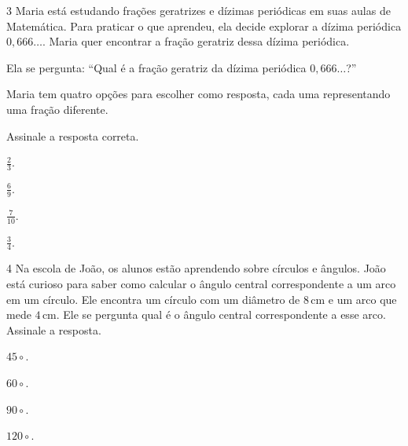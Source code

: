 \num{3} Maria está estudando frações geratrizes e dízimas periódicas em suas
aulas de Matemática. Para praticar o que aprendeu, ela decide explorar a
dízima periódica $0,666\ldots$. Maria quer encontrar a fração geratriz dessa
dízima periódica.

Ela se pergunta: “Qual é a fração geratriz da dízima periódica $0,666\ldots$?”

Maria tem quatro opções para escolher como resposta, cada uma representando uma fração diferente.

Assinale a resposta correta.

\begin{multicols}{2}
\begin{escolha}
\item $\frac{2}{3}$.
\item $\frac{6}{9}$.
\item $\frac{7}{10}$.
\item $\frac{3}{4}$.
\end{escolha}
\end{multicols}



\num{4} Na escola de João, os alunos estão aprendendo sobre círculos e
ângulos. João está curioso para saber como calcular o ângulo central
correspondente a um arco em um círculo. Ele encontra um círculo com um
diâmetro de $8\,\text{cm}$ e um arco que mede $4\,\text{cm}$. Ele se
pergunta qual é o ângulo central correspondente a esse arco. Assinale
a resposta.

\begin{multicols}{2}
\begin{escolha}
\item $45\circ$.

\item $60\circ$.

\item $90\circ$.

\item $120\circ$.
\end{escolha}
\end{multicols}

